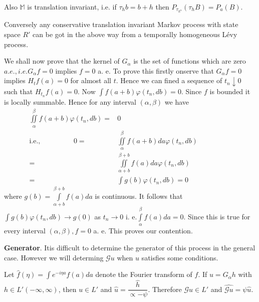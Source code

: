 Also $\mathbb{M}$ is translation invariant, i.e. if $\tau_h b = b+h$
then $P_{\tau_{h^a}}(\tau_h B) = P_a(B)$. 

Conversely any conservative translation invariant Markov process with
state space $R'$ can be got in the above way from a temporally
homogeneous L\'evy process. 

We shall now prove that the kernel of $G_{\alpha}$ is the set of
functions which are zero $a. e. , i. e. G_{\alpha} f = 0$ implies $f
=0$ a. e. To prove this firstly onserve that $G_{\alpha} f = 0$
implies $H_t f(a) =0$ for almost all $t$. Hence we can fined a
sequence of $t_n \downarrow 0$ such that $H_{t_{n}}f(a) =0$. Now
$\int f(a+b) \varphi (t_n,db)=0$. Since $f$ is bounded it is locally
summable. Hence for any interval $(\alpha, \beta)$ we have  
\begin{align*}
  \iint\limits^{\beta}_{\alpha} f(a + b) \varphi(t_n , db) =& 0\\ 
  \text{i.e.,}\hspace{2cm}  0 = &\iint \limits^{\beta}_{\alpha} f(a+b)
  da \varphi (t_n,   db)\hspace{2cm}\\ 
  = &\iint \limits^{\beta +b}_{\alpha+b} f(a) da \varphi (t_n, db)\\ 
  = & \int g(b) \varphi(t_n, db) = 0
\end{align*}
where $g(b) = \int \limits^{\beta+b}_{\alpha+b} f(a) da$ is
continuous. It follows that $\int g(b) \varphi (t_n, db) \to g(0)$ as
$t_n \to 0$ i. e.$\int \limits^{\beta}_{\alpha} f(a) da = 0$. Since
this is true for every interval $(\alpha, \beta), f = 0$ a. e. This
proves our contention. 

\noindent
\medskip
\textbf{Generator}. It\pageoriginale is difficult to determine the
generator of this 
process in the general case. However we will determing $\mathscr{G} u$
when $u$ satisfies some conditions. 

\setcounter{thm}{0}
\begin{thm}\label{chap4-sec6-thm1} %
  Let $\hat{f} (\eta) = \int e^{- i \eta a} f(a) da$ denote the
  Fourier transform of $f$. If $u = G_{\alpha} h$ with $h \in
  L'(-\infty, \infty)$, then $u \in L'$ and $\hat{u}=
  \dfrac{\hat{h}}{\propto - \psi}$. Therefore $\mathscr{G} u \in L'$
  and $\widehat{\mathscr{G} u} = \psi \hat{u}$. 
\end{thm} 

